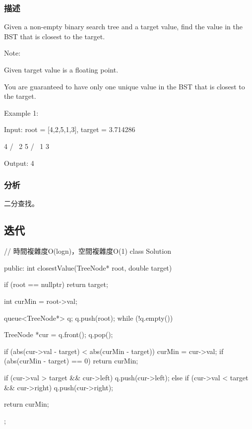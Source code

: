 \subsubsection{描述}
Given a non-empty binary search tree and a target value, find the value in the BST that is closest to the target.

Note:
\begindot
\item Given target value is a floating point.
\item You are guaranteed to have only one unique value in the BST that is closest to the target.
\myenddot


Example 1:
\begin{Code}
Input: root = [4,2,5,1,3], target = 3.714286

    4
   / \
  2   5
 / \
1   3

Output: 4
\end{Code}

\subsubsection{分析}
二分查找。


\subsection{迭代}
\begin{Code}
// 時間複雜度O(logn)，空間複雜度O(1)
class Solution {
public:
    int closestValue(TreeNode* root, double target) {
        if (root == nullptr) return target;

        int curMin = root->val;

        queue<TreeNode*> q;
        q.push(root);
        while (!q.empty()) {
            TreeNode *cur = q.front();
            q.pop();

            if (abs(cur->val - target) < abs(curMin - target)) {
                curMin = cur->val;
                if (abs(curMin - target) == 0) return curMin;
            }

            if (cur->val > target && cur->left)
                q.push(cur->left);
            else if (cur->val < target && cur->right)
                q.push(cur->right);
        }

        return curMin;
    }
};
\end{Code}

